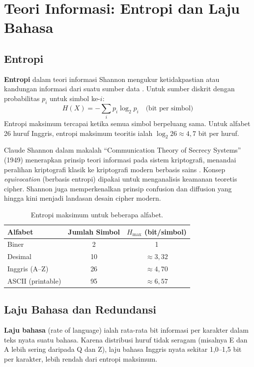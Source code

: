 \section{Teori Informasi: Entropi dan Laju Bahasa}

\subsection{Entropi}

\textbf{Entropi} dalam teori informasi Shannon mengukur ketidakpastian atau kandungan informasi dari suatu sumber data \cite{shannon1949,entropy_wikipedia}. Untuk sumber diskrit dengan probabilitas $p_i$ untuk simbol ke-$i$:
\[
H(X) = -\sum_{i} p_i \log_2 p_i \quad \text{(bit per simbol)}
\]
Entropi maksimum tercapai ketika semua simbol berpeluang sama. Untuk alfabet 26 huruf Inggris, entropi maksimum teoritis ialah $\log_2 26 \approx 4{,}7$ bit per huruf.

Claude Shannon dalam makalah ``Communication Theory of Secrecy Systems'' (1949) menerapkan prinsip teori informasi pada sistem kriptografi, menandai peralihan kriptografi klasik ke kriptografi modern berbasis sains \cite{shannon1949}. Konsep \textit{equivocation} (berbasis entropi) dipakai untuk menganalisis keamanan teoretis cipher. Shannon juga memperkenalkan prinsip confusion dan diffusion yang hingga kini menjadi landasan desain cipher modern.

\begin{table}[htbp]
\centering
\small
\begin{tabular}{|l|c|c|}
\toprule
\textbf{Alfabet} & \textbf{Jumlah Simbol} & $H_{\max}$ (bit/simbol) \\
\midrule
Biner & 2 & 1 \\
Desimal & 10 & $\approx 3{,}32$ \\
Inggris (A--Z) & 26 & $\approx 4{,}70$ \\
ASCII (printable) & 95 & $\approx 6{,}57$ \\
\bottomrule
\end{tabular}
\caption{Entropi maksimum untuk beberapa alfabet.}
\end{table}

\subsection{Laju Bahasa dan Redundansi}

\textbf{Laju bahasa} (rate of language) ialah rata-rata bit informasi per karakter dalam teks nyata suatu bahasa. Karena distribusi huruf tidak seragam (misalnya E dan A lebih sering daripada Q dan Z), laju bahasa Inggris nyata sekitar 1{,}0--1{,}5 bit per karakter, lebih rendah dari entropi maksimum.

